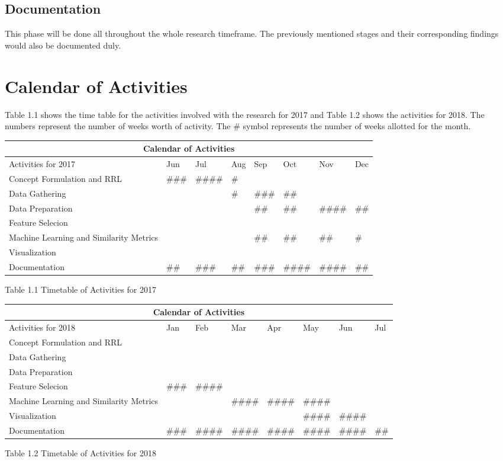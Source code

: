 \subsection{Documentation}
This phase will be done all throughout the whole research timeframe. The previously mentioned stages and their corresponding findings would also be documented duly.

\section{Calendar of Activities}
Table 1.1 shows the time table for the activities involved with the research for 2017 and Table 1.2 shows the activities for 2018. The numbers represent the number of weeks worth of activity. The \# symbol represents the number of weeks allotted for the month.

\begin{center}
\begin{tabular}{ |p{3.7cm}|p{1.2cm}|p{1.2cm}|p{1.2cm}|p{1.2cm}|p{1.2cm}|p{1.2cm}|p{1.2cm}| }
 \hline
 \multicolumn{8}{|c|}{Calendar of Activities} \\
 \hline
 Activities for 2017& Jun&Jul&Aug&Sep&Oct&Nov&Dec\\
 \hline
Concept Formulation and RRL&\#\#\#& \#\#\#\#&\#&&&&
 \\
\hline
Data Gathering&&&\#&\#\#\#&\#\#&&
 \\
\hline
Data Preparation&&&&\#\#&\#\#&\#\#\#\#&\#\#
 \\
 \hline
Feature Selecion&&&&&&&
 \\
 \hline
Machine Learning and Similarity Metrics&&&&\#\#&\#\#&\#\#&\#
 \\
 \hline
Visualization&&&&&&&
 \\
 \hline
Documentation&\#\#&\#\#\#& \#\#&\#\#\#&\#\#\#\#&\#\#\#\#&\#\#
 \\
 \hline
\end{tabular}
\end{center}
Table 1.1 Timetable of Activities for 2017

\begin{center}
\begin{tabular}{ |p{3.7cm}|p{1.2cm}|p{1.2cm}|p{1.2cm}|p{1.2cm}|p{1.2cm}|p{1.2cm}|p{1.2cm}| }
 \hline
 \multicolumn{8}{|c|}{Calendar of Activities} \\
 \hline
 Activities for 2018& Jan&Feb&Mar&Apr&May&Jun&Jul\\
 \hline
Concept Formulation and RRL&&&&&&&
 \\
\hline
Data Gathering&&&&&&&
 \\
\hline
Data Preparation&&&&&&&    
 \\
 \hline
Feature Selecion&\#\#\#&\#\#\#\#&&&&&    
 \\
 \hline
Machine Learning and Similarity Metrics&&&\#\#\#\#&\#\#\#\#& \#\#\#\#&& 
 \\
 \hline
Visualization&&&&&\#\#\#\#&\#\#\#\#&
 \\
 \hline
Documentation&\#\#\#&\#\#\#\#&\#\#\#\#&\#\#\#\#&\#\#\#\#&\#\#\#\#&\#\#
 \\
 \hline
\end{tabular}
\end{center}
Table 1.2 Timetable of Activities for 2018